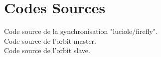 \documentclass[a4paper,8pt]{report}
\begin{document}
\newpage
\section*{Codes Sources}\label{sec:name}

Code source de la synchronisation "luciole/firefly".\\


Code source de l'orbit master.\\


Code source de l'orbit slave.\\


\nocite{*}


\end{document}
